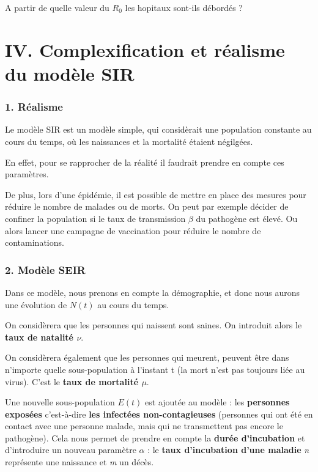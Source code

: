 \documentclass[
]{article}
\begin{document}
A partir de quelle valeur du \(R_0\) les hopitaux sont-ils débordés ?

\hypertarget{iv.-complexification-et-ruxe9alisme-du-moduxe8le-sir}{%
\section{IV. Complexification et réalisme du modèle
SIR}\label{iv.-complexification-et-ruxe9alisme-du-moduxe8le-sir}}

\hypertarget{ruxe9alisme}{%
\subsubsection{1. Réalisme}\label{ruxe9alisme}}

Le modèle SIR est un modèle simple, qui considèrait une population
constante au cours du temps, où les naissances et la mortalité étaient
négilgées.

En effet, pour se rapprocher de la réalité il faudrait prendre en compte
ces paramètres.

De plus, lors d'une épidémie, il est possible de mettre en place des
mesures pour réduire le nombre de malades ou de morts. On peut par
exemple décider de confiner la population si le taux de transmission
\(\beta\) du pathogène est élevé. Ou alors lancer une campagne de
vaccination pour réduire le nombre de contaminations.

\hypertarget{moduxe8le-seir}{%
\subsubsection{2. Modèle SEIR}\label{moduxe8le-seir}}

Dans ce modèle, nous prenons en compte la démographie, et donc nous
aurons une évolution de \(N(t)\) au cours du temps.

On considèrera que les personnes qui naissent sont saines. On introduit
alors le \textbf{taux de natalité \(\nu\)}.

On considèrera également que les personnes qui meurent, peuvent être
dans n'importe quelle sous-population à l'instant t (la mort n'est pas
toujours liée au virus). C'est le \textbf{taux de mortalité \(\mu\)}.

Une nouvelle sous-population \(E(t)\) est ajoutée au modèle : les
\textbf{personnes exposées} c'est-à-dire \textbf{les infectées
non-contagieuses} (personnes qui ont été en contact avec une personne
malade, mais qui ne transmettent pas encore le pathogène). Cela nous
permet de prendre en compte la \textbf{durée d'incubation} et
d'introduire un nouveau paramètre \(\alpha\) : le \textbf{taux
d'incubation d'une maladie} \emph{n} représente une naissance et
\emph{m} un décès.
\end{document}
